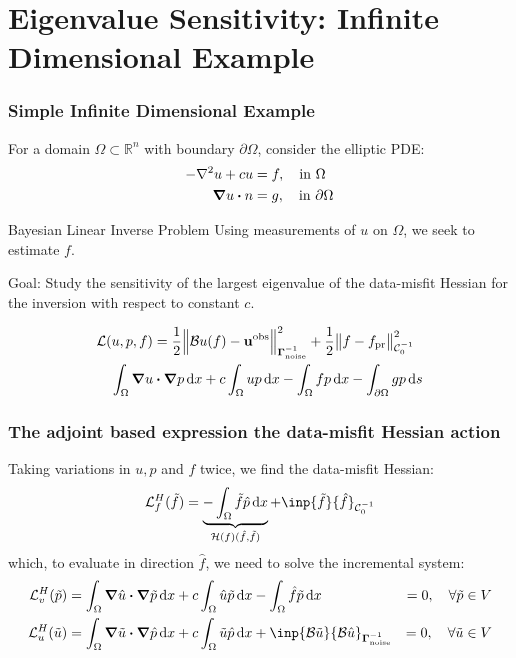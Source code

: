 \documentclass[
  pdf,
  10pt,
  xcolor={svgnames},
]{beamer}
\newcommand{\mc}[1]{\mathcal{#1}}
\newcommand{\R}{\mathbb{R}}
\newcommand{\mat}[1]{\mathbf{{#1}}}
\newcommand{\obs}{\mathbf{u}^{\rm obs}}
\newcommand{\Gnoise}{\mat{\Gamma}_{\rm noise}}
\begin{document}
\section{Eigenvalue Sensitivity: Infinite Dimensional Example}
\begin{frame}
  \frametitle{Simple Infinite Dimensional Example}
  For a domain $\Omega \subset \R^n$ with boundary $\partial \Omega$, consider the
  elliptic PDE:
  \begin{align*}
    -\laplacian u + c u & = f, \quad \text{in } \Omega         \\
    \grad u \vdot n     & = g, \quad \text{in } \partial\Omega
  \end{align*}
  \begin{alertblock}{Bayesian Linear Inverse Problem}
    Using measurements of $u$ on $\Omega$, we seek to estimate $f$.
  \end{alertblock}
  \pause
  \begin{alertblock}{Goal:}
    Study the sensitivity of the largest eigenvalue of the data-misfit Hessian
    for the inversion with respect to constant $c$.
  \end{alertblock}
  \pause
  \begin{align*}
     & \mc{L}(u,p,f)
    = \frac{1}{2} \norm{\mc{B}u(f) - \obs}_{\Gnoise^{-1}}^2
    + \frac{1}{2} \norm{f - f_{\rm pr}}_{\mc{C}_0^{-1}}^2 \\
     & \quad
    \int_\Omega \grad u \vdot \grad p \dd{x}
    + c \int_\Omega up \dd{x}
    - \int_\Omega fp \dd{x}
    - \int_{\partial\Omega} gp \dd{s}
  \end{align*}
\end{frame}

\begin{frame}
  \frametitle{The adjoint based expression the data-misfit Hessian action}
  Taking variations in $u,p$ and $f$ twice, we find the data-misfit Hessian:
  \[
    \mc{L}^H_f(\tilde{f})
    =
    \underbrace{
      - \int_\Omega \tilde{f} \hat{p} \dd{x}
    }_{\mc{H}(f)(\hat{f},\tilde{f})}
    + \inp{\tilde{f}}{\hat{f}}_{\mc{C}_0^{-1}}
  \]
  which, to evaluate in direction $\hat{f}$, we need to solve the incremental
  system:
  \begin{align*}
    \mc{L}^H_v(\tilde{p})
     & =
    \int_\Omega \grad \hat{u} \vdot \grad \tilde{p} \dd{x}
    + c\int_\Omega \hat{u} \tilde{p} \dd{x}
    - \int_\Omega \hat{f} \tilde{p} \dd{x}
     & = 0, \quad \forall \tilde{p} \in V \\
    \mc{L}^H_u(\tilde{u})
     & =
    \int_\Omega \grad \tilde{u} \vdot \grad \hat{p} \dd{x}
    + c \int_\Omega \tilde{u} \hat{p} \dd{x}
    + \inp{\mc{B} \tilde{u}}{\mc{B}\hat{u}}_{\Gnoise^{-1}}
     & = 0, \quad \forall \tilde{u} \in V
  \end{align*}
\end{frame}
\end{document}
